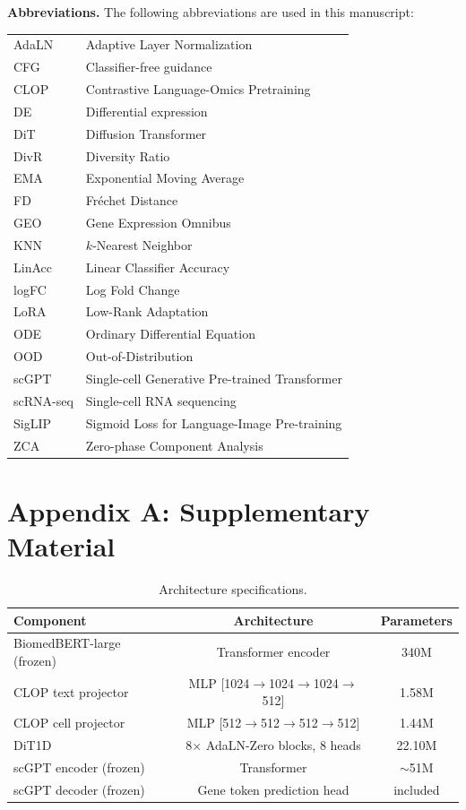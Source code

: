 \textbf{Abbreviations.}
The following abbreviations are used in this manuscript:\\[4pt]
\begin{tabular}{@{}ll}
AdaLN & Adaptive Layer Normalization\\
CFG & Classifier-free guidance\\
CLOP & Contrastive Language-Omics Pretraining\\
DE & Differential expression\\
DiT & Diffusion Transformer\\
DivR & Diversity Ratio\\
EMA & Exponential Moving Average\\
FD & Fr\'{e}chet Distance\\
GEO & Gene Expression Omnibus\\
KNN & $k$-Nearest Neighbor\\
LinAcc & Linear Classifier Accuracy\\
logFC & Log Fold Change\\
LoRA & Low-Rank Adaptation\\
ODE & Ordinary Differential Equation\\
OOD & Out-of-Distribution\\
scGPT & Single-cell Generative Pre-trained Transformer\\
scRNA-seq & Single-cell RNA sequencing\\
SigLIP & Sigmoid Loss for Language-Image Pre-training\\
ZCA & Zero-phase Component Analysis
\end{tabular}

\FloatBarrier
\appendix
\section{Appendix A: Supplementary Material}\label{app:suppl-tables}\label{app:hyperparams}

\begin{table}[!htbp]
\caption{Architecture specifications.\label{tab:architecture}}
\centering
\begin{tabularx}{\textwidth}{lCC}
\toprule
\textbf{Component} & \textbf{Architecture} & \textbf{Parameters} \\
\midrule
BiomedBERT-large (frozen) & Transformer encoder  & 340M \\
CLOP text projector       & MLP [1024$\to$1024$\to$1024$\to$512] & 1.58M \\
CLOP cell projector       & MLP [512$\to$512$\to$512$\to$512]    & 1.44M \\
DiT1D                     & 8$\times$ AdaLN-Zero blocks, 8 heads & 22.10M \\
scGPT encoder (frozen)    & Transformer                          & $\sim$51M \\
scGPT decoder (frozen)    & Gene token prediction head           & included \\
\bottomrule
\end{tabularx}
\end{table}

